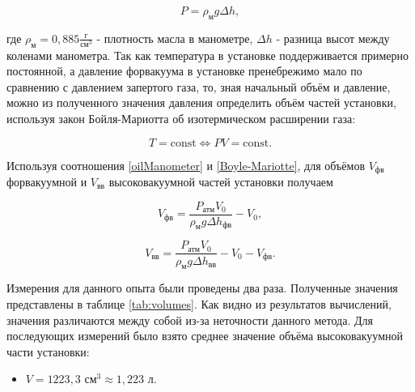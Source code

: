 \documentclass[a4paper,12pt]{article} %
\begin{document}
\begin{equation}
    P = \rho_\text{м} g\Delta h,
    \label{oilManometer}
\end{equation}

где $\rho_\text{м} = 0,885 \frac{\text{г}}{\text{см}^3}$ - плотность масла в манометре, $\Delta h$ - разница высот между коленами манометра. Так как температура в установке поддерживается примерно постоянной, а давление форвакуума в установке пренебрежимо мало по сравнению с давлением запертого газа, то, зная начальный объём и давление, можно из полученного значения давления определить объём частей установки, используя закон Бойля-Мариотта об изотермическом расширении газа:

\begin{equation}
    T = \text{const} \iff PV = \text{const}.
    \label{Boyle-Mariotte}
\end{equation}

Используя соотношения \eqref{oilManometer} и \eqref{Boyle-Mariotte}, для объёмов $V_\text{фв}$ форвакуумной и $V_\text{вв}$ высоковакуумной частей установки получаем

\begin{equation}
    V_\text{фв} = \frac{P_\text{атм}V_0}{\rho_\text{м}g\Delta h_\text{фв}} - V_0,
\end{equation}
    
\begin{equation}
    V_\text{вв} = \frac{P_\text{атм}V_0}{\rho_\text{м}g\Delta h_\text{вв}} - V_0 - V_\text{фв}.
\end{equation}

Измерения для данного опыта были проведены два раза. Полученные значения представлены в таблице \ref{tab:volumes}. Как видно из результатов вычислений, значения различаются между собой из-за неточности данного метода. Для последующих измерений было взято среднее значение объёма высоковакуумной части установки: 

\begin{itemize}
    \item $V = 1223,3 \text{ см}^3 \approx 1,223 \text{ л}$.
\end{itemize}
\end{document}
